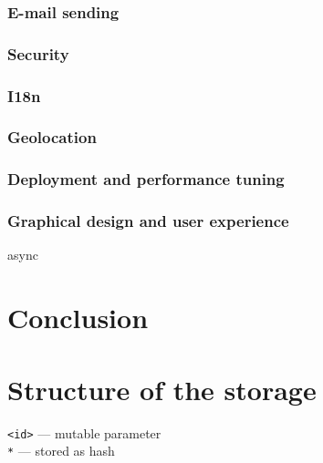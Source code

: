 \documentclass[12pt,oneside]{fithesis}
\begin{document}
	\subsection{E-mail sending}
	\label{section:email}
	\subsection{Security}
	\subsection{I18n}
	\subsection{Geolocation}
	\label{section:geo}
	\subsection{Deployment and performance tuning}
	\subsection{Graphical design and user experience}
	async
\chapter{Conclusion}

\appendix
\chapter{Structure of the storage}
\label{appendix:scheme}
\texttt{<id>} --- mutable parameter\\
\texttt{*} --- stored as hash
\inputminted[fontsize=\footnotesize]{yaml}{scheme.txt}


\end{document}
